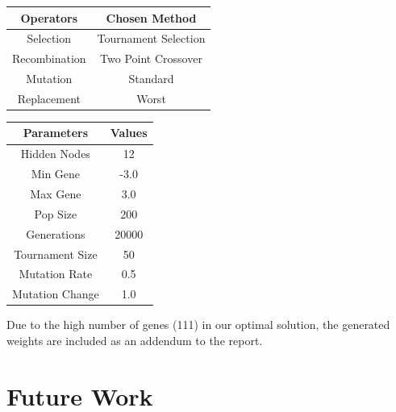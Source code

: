 \documentclass[sigconf]{acmart}
\begin{document}
\begin{center}
\begin{tabular} {|c|c|}
\hline
Operators & Chosen Method \\
\hline
Selection & Tournament Selection \\
Recombination & Two Point Crossover \\
Mutation & Standard \\
Replacement & Worst \\
\hline
\end{tabular}
\end{center}


\vspace{1em}
\begin{center}

\begin{tabular} {|c|c|}
\hline
Parameters & Values \\
\hline
Hidden Nodes & 12 \\
Min Gene & -3.0 \\
Max Gene & 3.0 \\
Pop Size & 200 \\
Generations & 20000 \\
Tournament Size & 50 \\
Mutation Rate & 0.5 \\
Mutation Change & 1.0 \\
\hline

\end{tabular}
\end{center}

Due to the high number of genes (111)  in our optimal solution, the generated weights are included as an addendum to the report.

\section{Future Work}





 
\end{document}
